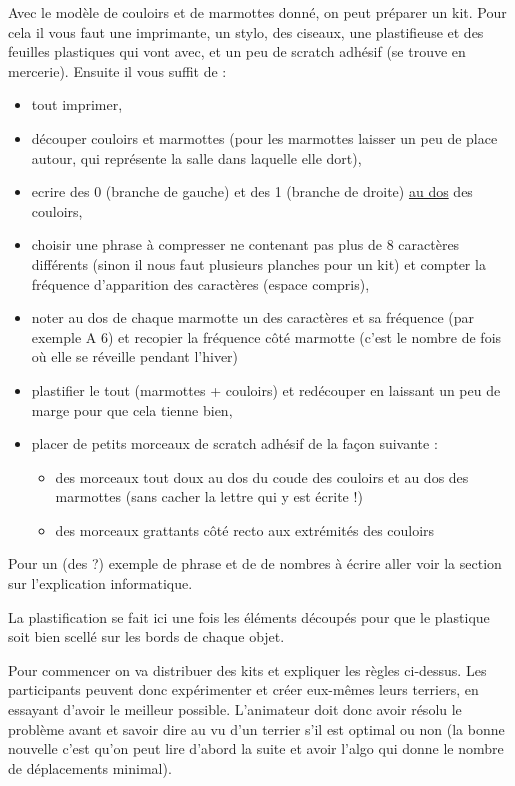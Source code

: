 \documentclass[a4paper,10pt]{article}
\begin{document}

Avec le modèle de couloirs et de marmottes donné, on peut préparer un
kit. Pour cela il vous faut une imprimante, un stylo, des ciseaux, une plastifieuse
et des feuilles plastiques qui vont avec, et un peu de scratch adhésif
(se trouve en mercerie). Ensuite il vous suffit de : 
\begin{itemize}
\item tout imprimer,
\item découper couloirs et marmottes (pour les marmottes laisser un
  peu de place autour, qui représente la salle dans laquelle elle dort),
\item ecrire des 0 (branche de gauche) et des 1 (branche de droite) 
  \underline{au dos} des couloirs,
\item choisir une phrase à compresser ne contenant pas plus de 8
  caractères différents (sinon il nous faut plusieurs planches pour un
  kit) et compter la fréquence d'apparition des caractères (espace
  compris),
\item noter au dos de chaque marmotte un des caractères et sa fréquence
  (par exemple A 6) et recopier la fréquence côté marmotte (c'est le
  nombre de fois où elle se réveille pendant l'hiver)
\item plastifier le tout (marmottes + couloirs) et redécouper en
  laissant un peu de marge pour que cela tienne bien,
\item placer de petits morceaux de scratch adhésif de la façon
  suivante :
  \begin{itemize}
  \item des morceaux tout doux au dos du coude des couloirs et au dos
    des marmottes (sans cacher la lettre qui y est écrite !)
  \item des morceaux grattants côté recto aux extrémités des couloirs
  \end{itemize}
\end{itemize}

Pour un (des ?) exemple de phrase et de de nombres à écrire aller voir la section sur l'explication
informatique.

La plastification se fait ici une fois les éléments découpés pour que
le plastique soit bien scellé sur les bords de chaque objet.


Pour commencer on va distribuer des kits et expliquer les règles
ci-dessus. Les participants peuvent donc expérimenter et créer
eux-mêmes leurs terriers, en essayant d'avoir le meilleur
possible. L'animateur doit donc avoir résolu le problème avant et
savoir dire au vu d'un terrier s'il est optimal ou non (la bonne
nouvelle c'est qu'on peut lire d'abord la suite et avoir l'algo qui
donne le nombre de déplacements minimal).
\end{document}
